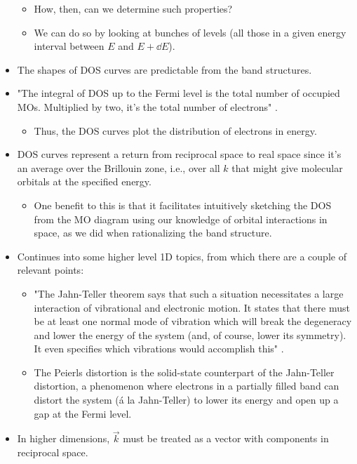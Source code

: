 \documentclass[../notes.tex]{subfiles}
\begin{document}
\begin{itemize}
\begin{itemize}
        \item How, then, can we determine such properties?
        \item We can do so by looking at bunches of levels (all those in a given energy interval between $E$ and $E+\dd{E}$).
    \end{itemize}
    \item The shapes of DOS curves are predictable from the band structures.
    \item "The integral of DOS up to the Fermi level is the total number of occupied MOs. Multiplied by two, it's the total number of electrons" \parencite[852]{bib:bandTheory}.
    \begin{itemize}
        \item Thus, the DOS curves plot the distribution of electrons in energy.
    \end{itemize}
    \item DOS curves represent a return from reciprocal space to real space since it's an average over the Brillouin zone, i.e., over all $k$ that might give molecular orbitals at the specified energy.
    \begin{itemize}
        \item One benefit to this is that it facilitates intuitively sketching the DOS from the MO diagram using our knowledge of orbital interactions in space, as we did when rationalizing the  band structure.
    \end{itemize}
    \item Continues into some higher level 1D topics, from which there are a couple of relevant points:
    \begin{itemize}
        \item "The Jahn-Teller theorem says that such a situation necessitates a large interaction of vibrational and electronic motion. It states that there must be at least one normal mode of vibration which will break the degeneracy and lower the energy of the system (and, of course, lower its symmetry). It even specifies which vibrations would accomplish this" \parencite[862]{bib:bandTheory}.
        \item The Peierls distortion is the solid-state counterpart of the Jahn-Teller distortion, a phenomenon where electrons in a partially filled band can distort the system (\'{a} la Jahn-Teller) to lower its energy and open up a gap at the Fermi level.
    \end{itemize}
    \item In higher dimensions, $\vec{k}$ must be treated as a vector with components in reciprocal space.

\end{itemize}
\end{document}
